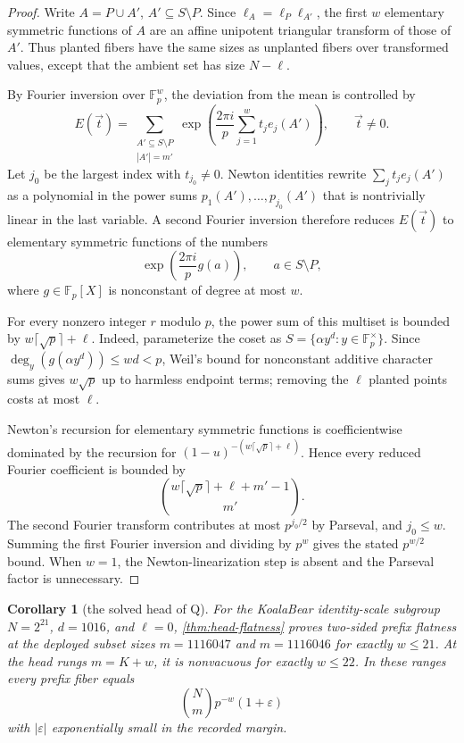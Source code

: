 \documentclass[a4paper,11pt]{amsart}
\newtheorem{corollary}[theorem]{Corollary}
\theoremstyle{remark}
\newcommand{\F}{\mathbb F}
\begin{document}
\begin{proof}
Write \(A=P\cup A'\), \(A'\subseteq S\setminus P\).  Since \(\ell_A=\ell_P\ell_{A'}\), the first \(w\) elementary symmetric functions of \(A\) are an affine unipotent triangular transform of those of \(A'\).  Thus planted fibers have the same sizes as unplanted fibers over transformed values, except that the ambient set has size \(N-\ell\).

By Fourier inversion over \(\F_p^w\), the deviation from the mean is controlled by
\[
        E(\vec t)=
        \sum_{\substack{A'\subseteq S\setminus P\\ |A'|=m'}}
        \exp\left(\frac{2\pi i}{p}\sum_{j=1}^w t_j e_j(A')\right),
        \qquad \vec t\ne0.
\]
Let \(j_0\) be the largest index with \(t_{j_0}\ne0\).  Newton identities rewrite \(\sum_jt_je_j(A')\) as a polynomial in the power sums \(p_1(A'),\ldots,p_{j_0}(A')\) that is nontrivially linear in the last variable.  A second Fourier inversion therefore reduces \(E(\vec t)\) to elementary symmetric functions of the numbers
\[
        \exp\left(\frac{2\pi i}{p}g(a)\right),
        \qquad a\in S\setminus P,
\]
where \(g\in\F_p[X]\) is nonconstant of degree at most \(w\).

For every nonzero integer \(r\) modulo \(p\), the power sum of this multiset is bounded by \(w\lceil\sqrt p\rceil+\ell\).  Indeed, parameterize the coset as \(S=\{\alpha y^d:y\in\F_p^\times\}\).  Since \(\deg_y(g(\alpha y^d))\le wd<p\), Weil's bound for nonconstant additive character sums \cite{Weil48} gives \(w\sqrt p\) up to harmless endpoint terms; removing the \(\ell\) planted points costs at most \(\ell\).

Newton's recursion for elementary symmetric functions is coefficientwise dominated by the recursion for \((1-u)^{-(w\lceil\sqrt p\rceil+\ell)}\).  Hence every reduced Fourier coefficient is bounded by
\[
        \binom{w\lceil\sqrt p\rceil+\ell+m'-1}{m'}.
\]
The second Fourier transform contributes at most \(p^{j_0/2}\) by Parseval, and \(j_0\le w\).  Summing the first Fourier inversion and dividing by \(p^w\) gives the stated \(p^{w/2}\) bound.  When \(w=1\), the Newton-linearization step is absent and the Parseval factor is unnecessary.
\end{proof}

\begin{corollary}[the solved head of Q]\label{cor:head-q}
For the KoalaBear identity-scale subgroup \(N=2^{21}\), \(d=1016\), and \(\ell=0\), \cref{thm:head-flatness} proves two-sided prefix flatness at the deployed subset sizes \(m=1116047\) and \(m=1116046\) for exactly \(w\le21\).  At the head rungs \(m=K+w\), it is nonvacuous for exactly \(w\le22\).  In these ranges every prefix fiber equals
\[
        \binom Nm p^{-w}(1+\varepsilon)
\]
with \(|\varepsilon|\) exponentially small in the recorded margin.
\end{corollary}
\end{document}
